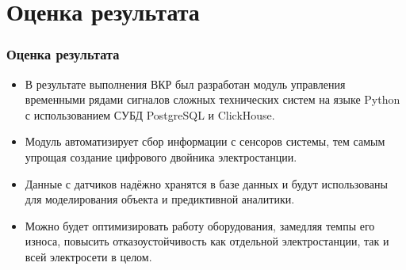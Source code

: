 \documentclass[pdf, hyperref={unicode}, aspectratio=169]{beamer}
\begin{document}
\section{Оценка результата}
\begin{frame}
	\frametitle{Оценка результата}
	
	\begin{itemize}
		\item В результате выполнения ВКР был разработан модуль управления временными рядами сигналов сложных технических систем на языке Python с использованием СУБД PostgreSQL и ClickHouse.
		\item Модуль автоматизирует сбор информации с сенсоров системы, тем самым упрощая создание цифрового двойника электростанции.
		\item Данные с датчиков надёжно хранятся в базе данных и будут использованы для моделирования объекта и предиктивной аналитики.
		\item Можно будет оптимизировать работу оборудования, замедляя темпы его износа, повысить отказоустойчивость как отдельной электростанции, так и всей электросети в целом.
	\end{itemize}
\end{frame}
\end{document}
